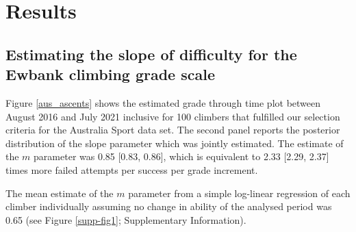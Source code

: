 \documentclass{article}
\begin{document}
{%


\section*{Results}

\subsection*{Estimating the slope of difficulty for the Ewbank climbing grade scale}


Figure \ref{aus_ascents} shows the estimated grade through time plot between August 2016 and July 2021 inclusive for 100 climbers that fulfilled our selection criteria for the Australia Sport data set. The second panel reports the posterior distribution of the slope parameter which was jointly estimated.
The estimate of the $m$ parameter was 0.85 [0.83, 0.86], which is equivalent to 2.33 [2.29, 2.37] times more failed attempts per success per grade increment. 

The mean estimate of the $m$ parameter from a simple log-linear regression of each climber individually assuming no change in ability of the analysed period was 0.65 (see Figure \ref{supp-fig1}; Supplementary Information). 

}
\end{document}
